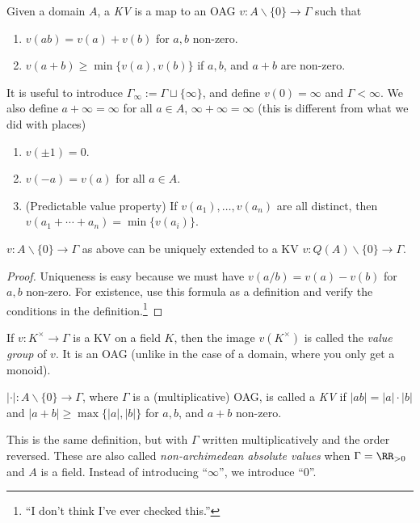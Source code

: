  \begin{definition}
   Given a domain $A$, a \emph{KV} is a map to an OAG $v:A\smallsetminus \{0\}\to \Gamma$
   such that
   \begin{enumerate}
     \item $v(ab)=v(a)+v(b)$ for $a,b$ non-zero.
     \item $v(a+b)\ge \min\{v(a), v(b)\}$ if $a,b$, and $a+b$ are non-zero.
   \end{enumerate}
 \end{definition}
 It is useful to introduce $\Gamma_\infty := \Gamma \sqcup \{\infty\}$, and define
 $v(0)=\infty$ and $\Gamma< \infty$. We also define $a+\infty = \infty$ for all $a\in A$,
 $\infty+\infty=\infty$ (this is different from what we did with places)

 \begin{proposition}
   \begin{enumerate}
     \item $v(\pm 1)=0$.
     \item $v(-a)=v(a)$ for all $a\in A$.
     \item (Predictable value property) If $v(a_1), \dots, v(a_n)$ are all distinct, then
     $v(a_1+\cdots +a_n)=\min \{v(a_i)\}$.
   \end{enumerate}
 \end{proposition}
 \begin{proposition}
   $v:A\smallsetminus \{0\} \to \Gamma$ as above can be uniquely extended to a KV
   $v:Q(A)\smallsetminus \{0\} \to \Gamma$.
 \end{proposition}
 \begin{proof}
   Uniqueness is easy because we must have $v(a/b)=v(a)-v(b)$ for $a,b$ non-zero. For
   existence, use this formula as a definition and verify the conditions in the
   definition.\footnote{``I don't think I've ever checked this.''}
 \end{proof}
 \begin{definition}
   If $v:K^\times \to \Gamma$ is a KV on a field $K$, then the image $v(K^\times)$ is called
   the \emph{value group} of $v$. It is an OAG (unlike in the case of a domain, where you
   only get a monoid).
 \end{definition}
 \begin{definition}
   $|\cdot|:A\smallsetminus \{0\}\to \Gamma$, where $\Gamma$ is a (multiplicative) OAG,
   is called a \emph{KV} if $|ab|=|a|\cdot |b|$ and $|a+b|\ge \max \{|a|,|b|\}$ for
   $a,b$, and $a+b$ non-zero.
 \end{definition}
 This is the same definition, but with $\Gamma$ written multiplicatively and the order
 reversed. These are also called \emph{non-archimedean absolute values} when $\Gamma =
 \RR_{> 0}$ and $A$ is a field. Instead of introducing ``$\infty$'', we introduce
 ``$0$''.

